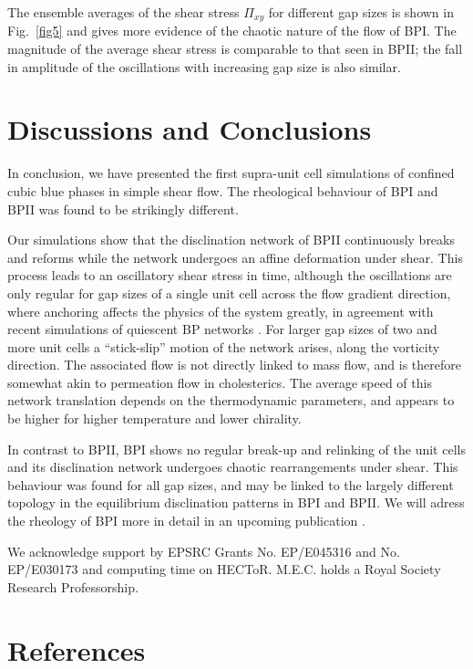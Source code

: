 \documentclass[12pt,twoside]{iopart}
\begin{document}
The ensemble averages of the shear stress $\Pi_{xy}$ for different gap sizes
is shown in Fig.~\ref{fig5} and gives more evidence of the chaotic nature of
the flow of BPI. The magnitude of the average shear stress is comparable to
that seen in BPII; the fall in amplitude of the oscillations with increasing
gap size is also similar.

\section{Discussions and Conclusions}

In conclusion, we have presented the first supra-unit cell simulations of
confined cubic blue phases in simple shear flow.
The rheological behaviour of BPI and BPII was found to be strikingly different.

Our simulations show that the disclination network of BPII continuously breaks and reforms while the network undergoes an affine deformation under shear. This process leads to an oscillatory shear stress in time, although the oscillations are only regular for gap sizes of a single unit cell across the flow gradient direction, where anchoring affects the physics of the system greatly, in agreement with recent simulations of quiescent BP networks \cite{Fukuda:2010a, Fukuda:2010b, Ravnik:2011b}.
For larger gap sizes of two and more unit cells a ``stick-slip'' motion of the network arises, along the vorticity direction. The associated flow is not directly linked to mass flow, and is therefore somewhat akin to permeation flow in cholesterics. The average speed of this network translation depends on the thermodynamic parameters, and appears to be higher for higher temperature and lower chirality. 

In contrast to BPII, BPI shows no regular break-up and relinking of the unit cells and its disclination network undergoes chaotic rearrangements under shear.
This behaviour was found for all gap sizes, and may be linked to the largely different topology in the equilibrium disclination patterns in BPI and BPII.
We will adress the rheology of BPI more in detail in an upcoming publication \cite{Henrich:2012}.  

\ack
We acknowledge support by EPSRC Grants No. EP/E045316 and No. EP/E030173 and computing time on HECToR.
M.E.C. holds a Royal Society Research Professorship.


\section*{References}



\end{document}
